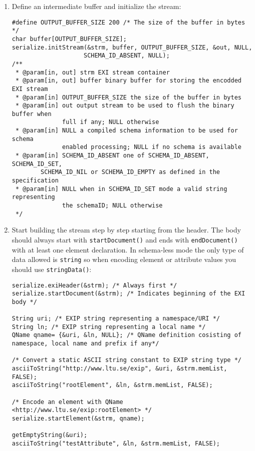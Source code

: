 \begin{enumerate}
 \item \label{item:initialization}  Define an intermediate buffer and initialize the stream:
\begin{lstlisting}
#define OUTPUT_BUFFER_SIZE 200 /* The size of the buffer in bytes */
char buffer[OUTPUT_BUFFER_SIZE];
serialize.initStream(&strm, buffer, OUTPUT_BUFFER_SIZE, &out, NULL, 
					SCHEMA_ID_ABSENT, NULL);
/**
 * @param[in, out] strm EXI stream container
 * @param[in, out] buffer binary buffer for storing the encodded EXI stream
 * @param[in] OUTPUT_BUFFER_SIZE the size of the buffer in bytes
 * @param[in] out output stream to be used to flush the binary buffer when
		      full if any; NULL otherwise
 * @param[in] NULL a compiled schema information to be used for schema
		      enabled processing; NULL if no schema is available
 * @param[in] SCHEMA_ID_ABSENT one of SCHEMA_ID_ABSENT, SCHEMA_ID_SET,
		SCHEMA_ID_NIL or SCHEMA_ID_EMPTY as defined in the specification
 * @param[in] NULL when in SCHEMA_ID_SET mode a valid string representing
		      the schemaID; NULL otherwise
 */                             
\end{lstlisting}

 \item \label{item:encoding} Start building the stream step by step starting from the header. The body should always start with
    \texttt{startDocument()} and ends with \texttt{endDocument()} with at least one element declaration.
In schema-less mode the only type of data allowed is \texttt{string} so when encoding element or
attribute values you should use \texttt{stringData()}:
\begin{lstlisting}
serialize.exiHeader(&strm); /* Always first */
serialize.startDocument(&strm); /* Indicates beginning of the EXI body */

String uri; /* EXIP string representing a namespace/URI */
String ln; /* EXIP string representing a local name */
QName qname= {&uri, &ln, NULL}; /* QName definition cosisting of
namespace, local name and prefix if any*/

/* Convert a static ASCII string constant to EXIP string type */
asciiToString("http://www.ltu.se/exip", &uri, &strm.memList, FALSE);
asciiToString("rootElement", &ln, &strm.memList, FALSE);

/* Encode an element with QName <http://www.ltu.se/exip:rootElement> */
serialize.startElement(&strm, qname);

getEmptyString(&uri);
asciiToString("testAttribute", &ln, &strm.memList, FALSE);


\end{lstlisting}
\end{enumerate}
